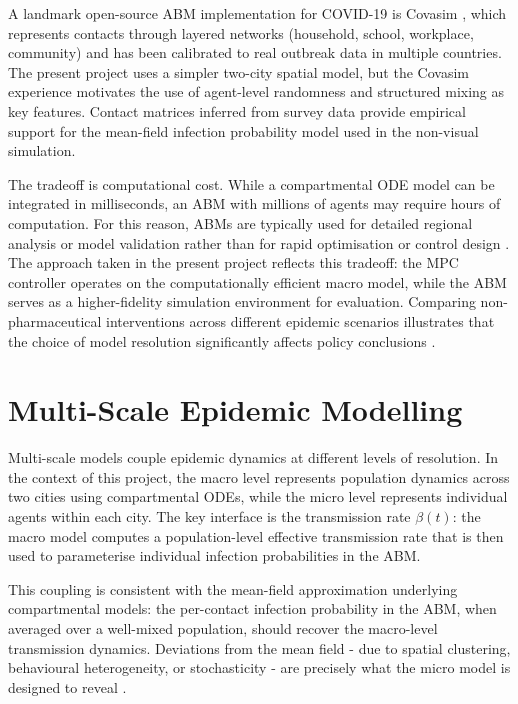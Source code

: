 A landmark open-source ABM implementation for COVID-19 is Covasim \citep{kerr2021}, which represents contacts through layered networks (household, school, workplace, community) and has been calibrated to real outbreak data in multiple countries.
The present project uses a simpler two-city spatial model, but the Covasim experience motivates the use of agent-level randomness and structured mixing as key features.
Contact matrices inferred from survey data \citep{zhang2021} provide empirical support for the mean-field infection probability model used in the non-visual simulation.

The tradeoff is computational cost.
While a compartmental ODE model can be integrated in milliseconds, an ABM with millions of agents may require hours of computation.
For this reason, ABMs are typically used for detailed regional analysis or model validation rather than for rapid optimisation or control design \citep{polcz2025}.
The approach taken in the present project reflects this tradeoff: the MPC controller operates on the computationally efficient macro model, while the ABM serves as a higher-fidelity simulation environment for evaluation.
Comparing non-pharmaceutical interventions across different epidemic scenarios illustrates that the choice of model resolution significantly affects policy conclusions \citep{peak2017}.

\section{Multi-Scale Epidemic Modelling}
\label{sec:multiscale}

Multi-scale models couple epidemic dynamics at different levels of resolution.
In the context of this project, the macro level represents population dynamics across two cities using compartmental ODEs, while the micro level represents individual agents within each city.
The key interface is the transmission rate $\beta(t)$: the macro model computes a population-level effective transmission rate that is then used to parameterise individual infection probabilities in the ABM.

This coupling is consistent with the mean-field approximation underlying compartmental models: the per-contact infection probability in the ABM, when averaged over a well-mixed population, should recover the macro-level transmission dynamics.
Deviations from the mean field - due to spatial clustering, behavioural heterogeneity, or stochasticity - are precisely what the micro model is designed to reveal \citep{grundel2022}.

